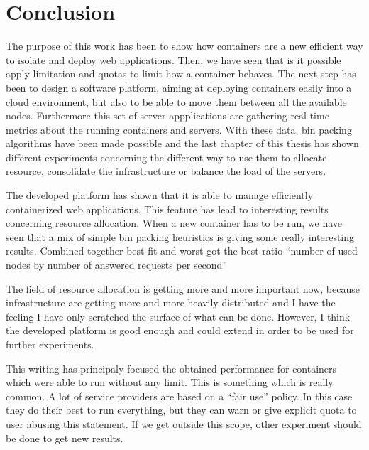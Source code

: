 \clearpage
\section*{Conclusion}

The purpose of this work has been to show how containers are a new efficient
way to isolate and deploy web applications. Then, we have seen that is it
possible apply limitation and quotas to limit how a container behaves. The next
step has been to design a software platform, aiming at deploying containers
easily into a cloud environment, but also to be able to move them between all
the available nodes. Furthermore this set of server appplications are gathering
real time metrics about the running containers and servers. With these data,
bin packing algorithms have been made possible and the last chapter of this
thesis has shown different experiments concerning the different way to use them
to allocate resource, consolidate the infrastructure or balance the load of the
servers.
\vspace{1em}

The developed platform has shown that it is able to manage efficiently
containerized web applications. This feature has lead to interesting results
concerning resource allocation. When a new container has to be run, we have
seen that a mix of simple bin packing heuristics is giving some really
interesting results. Combined together best fit and worst got the best ratio
``number of used nodes by number of answered requests per second''
\vspace{1em}

The field of resource allocation is getting more and more important now,
because infrastructure are getting more and more heavily distributed and I
have the feeling I have only scratched the surface of what can be done.
However, I think the developed platform is good enough and could extend
in order to be used for further experiments.
\vspace{1em}

This writing has principaly focused the obtained performance for containers
which were able to run without any limit. This is something which is really
common. A lot of service providers are based on a ``fair use'' policy. In this
case they do their best to run everything, but they can warn or give explicit
quota to user abusing this statement. If we get outside this scope, other
experiment should be done to get new results.
\vspace{1em}

